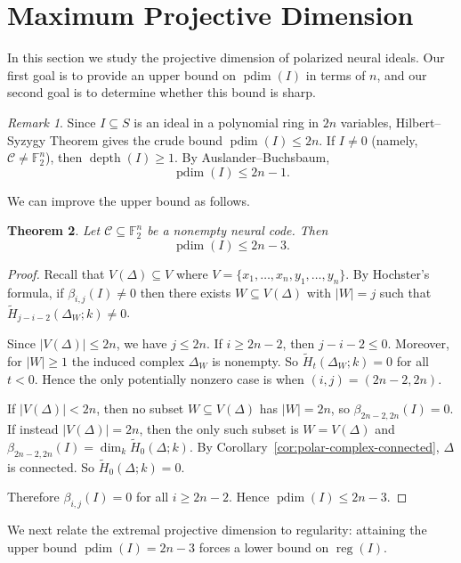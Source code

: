 \documentclass[12pt]{amsart}
\newtheorem{theorem}{Theorem}[section]
\theoremstyle{remark}
\newtheorem{remark}[theorem]{Remark}
\theoremstyle{definition}
\DeclareMathOperator{\reg}{reg}
\DeclareMathOperator{\depth}{depth}
\DeclareMathOperator{\pd}{pdim}
\newcommand{\F}{\mathbb{F}}
\newcommand{\C}{\mathcal{C}}
\begin{document}
\section{Maximum Projective Dimension}\label{sect:results}

In this section we study the projective dimension of polarized neural ideals. Our first goal is to provide an upper bound on
$\pd(I)$ in terms of $n$, and our second goal is to determine whether this bound is sharp.


\begin{remark}\label{rem:degenerate}
Since $I\subseteq S$ is an ideal in a polynomial ring in $2n$ variables, Hilbert--Syzygy Theorem gives the crude bound
$\pd(I)\le 2n$.  If $I\neq 0$ (namely, $\C\neq \F_2^n$), then  
$\depth(I)\ge 1$.  By Auslander--Buchsbaum,
\[
\pd (I)\le 2n-1.
\]
\end{remark}

We can improve the upper bound as follows. 

\begin{theorem}\label{thm:pdim_upper_bound}
Let $\C\subseteq\F_2^n$ be a nonempty neural code. Then
\[
\pd(I) \le 2n-3.
\]
\end{theorem}


\begin{proof}
Recall that $V(\Delta)\subseteq V$ where $V=\{x_1,\dots,x_n,y_1,\dots,y_n\}$.
By Hochster’s formula, if $\beta_{i,j}(I)\neq 0$ then there exists $W\subseteq V(\Delta)$ with $|W|=j$
such that $\widetilde H_{j-i-2}(\Delta_W;k)\neq 0$.

Since $|V(\Delta)|\le 2n$, we have $j\le 2n$. If $i\ge 2n-2$, then $j-i-2\le 0$.
Moreover, for $|W|\ge 1$ the induced complex $\Delta_W$ is nonempty. So $\widetilde H_t(\Delta_W;k)=0$
for all $t<0$. Hence the only potentially nonzero case is when $(i,j)=(2n-2,2n)$.

If $|V(\Delta)|<2n$, then no subset $W\subseteq V(\Delta)$ has $|W|=2n$, so $\beta_{2n-2,2n}(I)=0$.
If instead $|V(\Delta)|=2n$, then the only such subset is $W=V(\Delta)$ and 
$\beta_{2n-2,2n}(I)=\dim_k \widetilde H_0(\Delta;k)$.
By Corollary~\ref{cor:polar-complex-connected}, $\Delta$ is connected. So $\widetilde H_0(\Delta;k)=0$.

Therefore $\beta_{i,j}(I)=0$ for all $i\ge 2n-2$. Hence  $\pd(I)\le 2n-3$.
\end{proof}



We next relate the extremal projective dimension to regularity: attaining the upper bound
$\pd(I)=2n-3$ forces a lower bound on $\reg (I)$.
\end{document}
